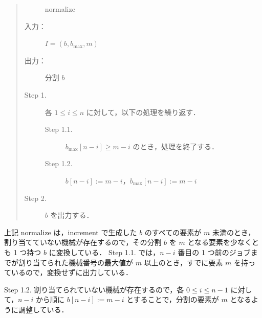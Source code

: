 \documentclass[12pt]{optlab-bachelor}
\begin{document}
\begin{quote}
  \begin{description}
    \item[]  {\sc normalize}
    \item[入力：] $I = (b, b_{\max}, m)$
    \item[出力：] 分割 $b$
  \end{description}
  \begin{description}
    \item[Step 1.] 各 $1 \le i \le n$ に対して，以下の処理を繰り返す．
    \begin{description}
      \item[Step 1.1.] $b_{\max}[n - i] \ge m - i$ のとき，処理を終了する．
      \item[Step 1.2.] $b[n - i] := m - i$，$b_{\max}[n - i] := m - i$
    \end{description}
    \item[Step 2.] $b$ を出力する．
  \end{description}
\end{quote}

上記 {\sc normalize} は，{\sc increment} で生成した $b$ のすべての要素が $m$ 未満のとき，割り当てていない機械が存在するので，その分割 $b$ を $m$ となる要素を少なくとも 1 つ持つ $b$ に変換している．
Step 1.1. では，$n - i$ 番目の 1 つ前のジョブまでが割り当てられた機械番号の最大値が $m$ 以上のとき，すでに要素 $m$ を持っているので，変換せずに出力している．

Step 1.2. 割り当てられていない機械が存在するので，各 $0 \le i \le n - 1$ に対して，$n - i$ から順に $b[n-i] := m - i$ とすることで，分割の要素が $m$ となるように調整している．
\end{document}
